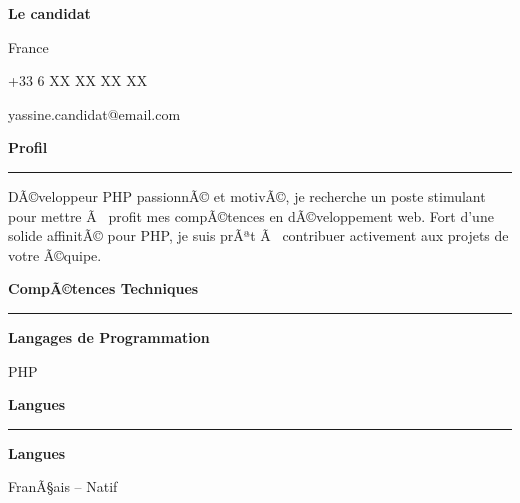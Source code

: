 \documentclass[a4paper,10pt]{article}
\newlength{\cvleftcolumnwidth}
\newlength{\cvrightcolumnwidth}
\newlength{\cvcolumngapwidth}
\newlength{\cvbeforenameamount}
\newlength{\cvafternameamount}
\newlength{\cvaftersectionskipamount}
\newlength{\cvafteritemskipamount}
\newlength{\cvbetweensectionandheadingextraskipamount}
\newlength{\cvparskip}
\newcommand{\cvnamestyle}[1]{\Huge\textbf{#1}}
\newcommand{\cvsectionstyle}[1]{\large\textbf{#1}}
\newcommand{\cvheadingstyle}[1]{\textbf{#1}}
\newcommand{\cvpersonalinfo}[2]{%
    \begin{minipage}[t]{\cvleftcolumnwidth}
        \vspace{0mm} %
        \raggedleft #1
    \end{minipage}%
    \hspace{\cvcolumngapwidth}%
    \begin{minipage}[t]{\cvrightcolumnwidth}
        \vspace{0mm} %
        #2
    \end{minipage}

    \vspace{\cvafternameamount}
}
\newcommand{\cvname}[1]{%
    \vspace{\cvbeforenameamount}

    \cvnamestyle{#1}

    \vspace{\cvparskip}
}
\newcommand{\cvpersonalinfolinewithicon}[2]{%
    \makebox[1em][c]{\small#1} 
    #2

    \vspace{\cvparskip}
}
\newcommand{\cvsection}[1]{%
    \begin{minipage}[t]{\cvleftcolumnwidth}
        \raggedleft\cvsectionstyle{#1}
    \end{minipage}%
    \hspace{\cvcolumngapwidth}%
    \begin{minipage}[t]{\cvrightcolumnwidth}
        \textcolor{cvrulecolor}{\rule{\cvrightcolumnwidth}{0.3mm}}
    \end{minipage}

    \vspace{\cvaftersectionskipamount}
}
\newcommand{\cvitem}[2]{%
    \begin{minipage}[t]{\cvleftcolumnwidth}
        \raggedleft #1
    \end{minipage}%
    \hspace{\cvcolumngapwidth}%
    \begin{minipage}[t]{\cvrightcolumnwidth}
        \setlength{\parskip}{\cvparskip} #2
    \end{minipage}\par

    \vspace{\cvafteritemskipamount}
}
\begin{document}

\cvpersonalinfo{
}{
    \cvname{Le candidat}

    \cvpersonalinfolinewithicon{\faMapMarker}{
        France
    }

    \cvpersonalinfolinewithicon{\faPhone}{
        +33 6 XX XX XX XX
    }

    \cvpersonalinfolinewithicon{\faEnvelope}{
        yassine.candidat@email.com
    }

}


\cvsection{Profil}

\cvitem{
}{
    DÃ©veloppeur PHP passionnÃ© et motivÃ©, je recherche un poste stimulant pour mettre Ã  profit mes compÃ©tences en dÃ©veloppement web. Fort d'une solide affinitÃ© pour PHP, je suis prÃªt Ã  contribuer activement aux projets de votre Ã©quipe.
}






\cvsection{CompÃ©tences Techniques}

\vspace{\cvbetweensectionandheadingextraskipamount}

\cvitem{
    \cvheadingstyle{Langages de Programmation}
}{
    PHP
}


\cvsection{Langues}

\vspace{\cvbetweensectionandheadingextraskipamount}

\cvitem{
    \cvheadingstyle{Langues}
}{
    FranÃ§ais -- Natif
}
\end{document}
